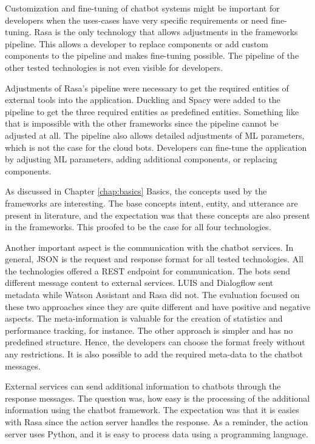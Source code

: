 Customization and fine-tuning of chatbot systems might be important for developers when the uses-cases have very specific requirements or need fine-tuning.
Rasa is the only technology that allows adjustments in the frameworks pipeline.
This allows a developer to replace components or add custom components to the pipeline and makes fine-tuning possible.
The pipeline of the other tested technologies is not even visible for developers.

Adjustments of Rasa's pipeline were necessary to get the required entities of external tools into the application.
Duckling and Spacy were added to the pipeline to get the three required entities as predefined entities.
Something like that is impossible with the other frameworks since the pipeline cannot be adjusted at all.
The pipeline also allows detailed adjustments of ML parameters, which is not the case for the cloud bots.
Developers can fine-tune the application by adjusting ML parameters, adding additional components, or replacing components.

As discussed in Chapter \ref{chap:basics} Basics, the concepts used by the frameworks are interesting.
The base concepts intent, entity, and utterance are present in literature, and the expectation was that these concepts are also present in the frameworks.
This proofed to be the case for all four technologies.

Another important aspect is the communication with the chatbot services.
In general, JSON is the request and response format for all tested technologies.
All the technologies offered a REST endpoint for communication.
The bots send different message content to external services.
LUIS and Dialogflow sent metadata while Watson Assistant and Rasa did not.
The evaluation focused on these two approaches since they are quite different and have positive and negative aspects.
The meta-information is valuable for the creation of statistics and performance tracking, for instance.
The other approach is simpler and has no predefined structure.
Hence, the developers can choose the format freely without any restrictions.
It is also possible to add the required meta-data to the chatbot messages. 

External services can send additional information to chatbots through the response messages.
The question was, how easy is the processing of the additional information using the chatbot framework.
The expectation was that it is easies with Rasa since the action server handles the response.
As a reminder, the action server uses Python, and it is easy to process data using a programming language.

